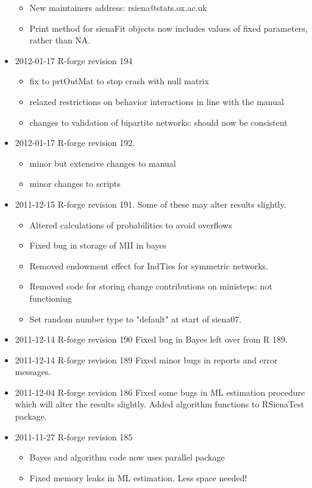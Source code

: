 \documentclass[a4paper,fleqn,11pt]{article}
\newcommand{\+}{\, + \,}
\begin{document}
\begin{small}
\begin{itemize}
\begin{itemize}
\item New maintainers address: rsiena@stats.ox.ac.uk
\item Print method for sienaFit objects now includes values of fixed parameters,
  rather than NA.
\end{itemize}
\item 2012-01-17 R-forge revision 194
\begin{itemize}
\item fix to prtOutMat to stop crash with null matrix
\item relaxed restrictions on behavior interactions in line with the manual
\item changes to validation of bipartite networks: should now be consistent
\end{itemize}
\item 2012-01-17 R-forge revision 192.
\begin{itemize}
\item minor but extensive changes to manual
\item minor changes to scripts
\end{itemize}
\item 2011-12-15 R-forge revision 191. Some of these may alter results slightly.
\begin{itemize}
\item Altered calculations of probabilities to avoid overflows
\item Fixed bug in storage of MII in bayes
\item Removed endowment effect for IndTies for symmetric networks.
\item Removed code for storing change contributions on ministeps: not
  functioning
\item Set random number type to "default" at start of siena07.
\end{itemize}
\item 2011-12-14 R-forge revision 190
Fixed bug in Bayes left over from R 189.
\item 2011-12-14 R-forge revision 189
 Fixed minor bugs in reports and error messages.
\item 2011-12-04 R-forge revision 186
Fixed some bugs in ML estimation procedure which will alter the results
slightly. Added algorithm functions to RSienaTest package.
\item 2011-11-27 R-forge revision 185
\begin{itemize}
\item Bayes and algorithm code now uses parallel package
\item Fixed memory leaks in ML estimation. Less space needed!

\end{itemize}
\end{itemize}
\end{small}
\end{document}
